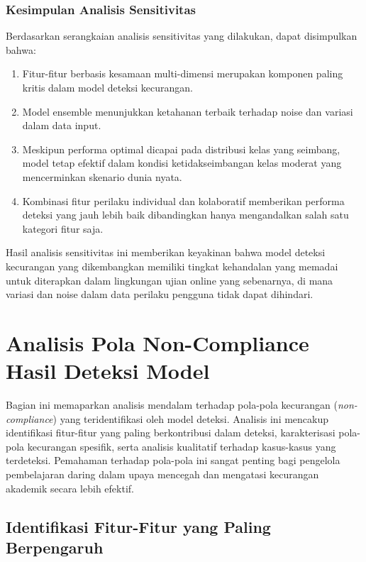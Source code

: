 \subsubsection{Kesimpulan Analisis Sensitivitas}

Berdasarkan serangkaian analisis sensitivitas yang dilakukan, dapat disimpulkan bahwa:

\begin{enumerate}
    \item Fitur-fitur berbasis kesamaan multi-dimensi merupakan komponen paling kritis dalam model deteksi kecurangan.
    \item Model ensemble menunjukkan ketahanan terbaik terhadap noise dan variasi dalam data input.
    \item Meskipun performa optimal dicapai pada distribusi kelas yang seimbang, model tetap efektif dalam kondisi ketidakseimbangan kelas moderat yang mencerminkan skenario dunia nyata.
    \item Kombinasi fitur perilaku individual dan kolaboratif memberikan performa deteksi yang jauh lebih baik dibandingkan hanya mengandalkan salah satu kategori fitur saja.
\end{enumerate}

Hasil analisis sensitivitas ini memberikan keyakinan bahwa model deteksi kecurangan yang dikembangkan memiliki tingkat kehandalan yang memadai untuk diterapkan dalam lingkungan ujian online yang sebenarnya, di mana variasi dan noise dalam data perilaku pengguna tidak dapat dihindari.

\section{Analisis Pola Non-Compliance Hasil Deteksi Model}
\label{sec:analisisPolaNonCompliance}

Bagian ini memaparkan analisis mendalam terhadap pola-pola kecurangan (\textit{non-compliance}) yang teridentifikasi oleh model deteksi. Analisis ini mencakup identifikasi fitur-fitur yang paling berkontribusi dalam deteksi, karakterisasi pola-pola kecurangan spesifik, serta analisis kualitatif terhadap kasus-kasus yang terdeteksi. Pemahaman terhadap pola-pola ini sangat penting bagi pengelola pembelajaran daring dalam upaya mencegah dan mengatasi kecurangan akademik secara lebih efektif.

\subsection{Identifikasi Fitur-Fitur yang Paling Berpengaruh}
\label{subsec:fiturPalingBerpengaruh}

